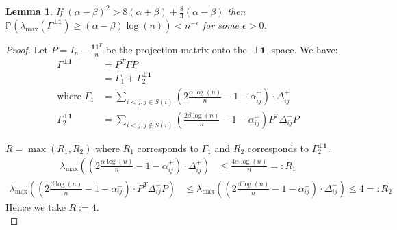 \documentclass[english]{article}
\newtheorem{lemma}{Lemma}
\newcommand{\1}{\textbf{1}}
\newcommand{\A}{\frac{\alpha \log(n)}{n}}
\newcommand{\B}{\frac{\beta \log(n)}{n}}
\newcommand{\p}{\mathbb{P}}
\begin{document}
\begin{lemma} \label{lemma:projorth1}
If $(\alpha-\beta)^2>8(\alpha+\beta)+\frac{8}{3}(\alpha-\beta)$ then $\p\left(\lambda_{\max}(\Gamma^{\perp \1}) \geq (\alpha -\beta) \log(n)\right)< n^{-\epsilon}$ for some $\epsilon>0$.
\end{lemma}
\begin{proof} Let $P=I_{n}-\frac{\1 \1^T}{n}$ be the projection matrix onto the $\perp \1$ space. We have:
\begin{align}
\Gamma^{\perp \1} &= P^T \Gamma P\\
&=\Gamma_1+\Gamma_2^{\perp \1}\\
\text{where } \Gamma_1 &= \sum_{i<j, j \in S(i)}\left(2\A-1 - \alpha^{+}_{ij}\right) \cdot \Delta^+_{ij} \\
\Gamma_2^{\perp \1}&=\sum_{i<j, j \notin S(i)} \left( \frac{2\beta \log(n)}{n} - 1 -\alpha_{ij}^- \right) P^T \Delta_{ij}^- P 
\end{align}

$R=\max(R_1,R_2)$ where $R_1$ corresponds to $\Gamma_1$ and $R_2$ corresponds to $\Gamma_2^{\perp \1}$.
\begin{align}
\lambda_{\max}\left(\left(2\A-1 - \alpha^{+}_{ij}\right) \cdot \Delta^+_{ij} \right) &\leq \frac{4 \alpha \log(n)}{n} =:R_1 
\end{align}
\begin{align}
\lambda_{\max}\left(\left(2\B-1 - \alpha^{-}_{ij}\right) \cdot P^T \Delta^-_{ij}P  \right) & \leq   \lambda_{\max}\left(\left(2\B-1 - \alpha^{-}_{ij}\right) \cdot \Delta^-_{ij} \right) \leq 4 =: R_2
\end{align}
Hence we take $R:=4$.\\


\end{proof}
\end{document}
